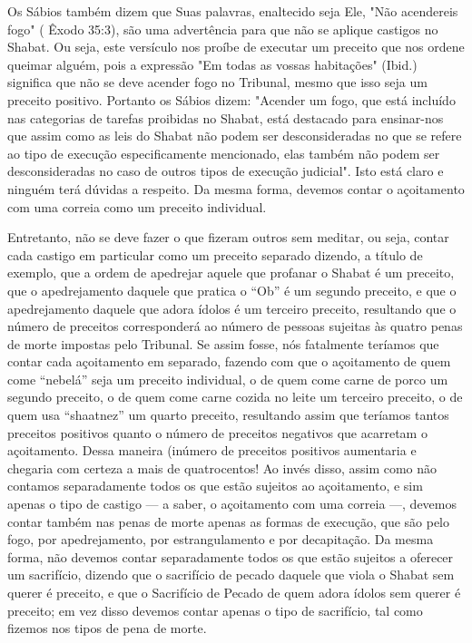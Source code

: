 Os Sábios também dizem que Suas palavras, enaltecido seja Ele, "Não
acendereis fogo" ( Êxodo 35:3), são uma advertência para que não se
aplique castigos no Shabat. Ou seja, este versículo nos proíbe de
executar um preceito que nos ordene queimar alguém, pois a expressão "Em
todas as vossas habita­ções" (Ibid.) significa que não se deve acender
fogo no Tribunal, mesmo que isso seja um preceito positivo. Portanto os
Sábios dizem: "Acender um fogo, que está incluído nas categorias de
tarefas proibidas no Shabat, está destacado para ensinar-nos que assim
como as leis do Shabat não podem ser desconside­radas no que se refere
ao tipo de execução especificamente mencionado, elas também não podem
ser desconsideradas no caso de outros tipos de execução judicial". Isto
está claro e ninguém terá dúvidas a respeito. Da mesma forma, devemos
contar o açoitamento com uma correia como um preceito individual.

Entretanto, não se deve fazer o que fizeram outros sem meditar, ou seja,
contar cada castigo em particular como um preceito separado dizendo, a
título de exemplo, que a ordem de apedrejar aquele que profanar o Shabat
é um preceito, que o apedrejamento daquele que pratica o ``Ob'' é um
segun­do preceito, e que o apedrejamento daquele que adora ídolos é um
terceiro preceito, resultando que o número de preceitos corresponderá ao
número de pessoas sujeitas às quatro penas de morte impostas pelo
Tribunal. Se assim fos­se, nós fatalmente teríamos que contar cada
açoitamento em separado, fazendo com que o açoitamento de quem come
``nebelá'' seja um preceito individual, o de quem come carne de porco um
segundo preceito, o de quem come carne cozida no leite um terceiro
preceito, o de quem usa ``shaatnez'' um quarto pre­ceito, resultando assim
que teríamos tantos preceitos positivos quanto o núme­ro de preceitos
negativos que acarretam o açoitamento. Dessa maneira (inú­mero de
preceitos positivos aumentaria e chegaria com certeza a mais de
qua­trocentos! Ao invés disso, assim como não contamos separadamente
todos os que estão sujeitos ao açoitamento, e sim apenas o tipo de
castigo --- a saber, o açoitamento com uma correia ---, devemos contar
também nas penas de morte apenas as formas de execução, que são pelo
fogo, por apedrejamento, por es­trangulamento e por decapitação. Da
mesma forma, não devemos contar sepa­radamente todos os que estão
sujeitos a oferecer um sacrifício, dizendo que o sacrifício de pecado
daquele que viola o Shabat sem querer é preceito, e que o Sacrifício de
Pecado de quem adora ídolos sem querer é preceito; em vez disso devemos
contar apenas o tipo de sacrifício, tal como fizemos nos tipos de pena
de morte.

